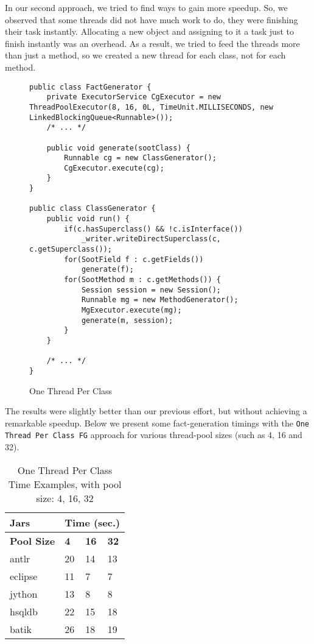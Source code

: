 \documentclass{dithesis}
\begin{document}
        In our second approach, we tried to find ways to gain more speedup. So, we observed that some threads did not have much work to do, they were finishing their task instantly. Allocating a new object and assigning to it a task just to finish instantly was an overhead. As a result, we tried to feed the threads more than just a method, so we created a new thread for each class, not for each method.
        \begin{figure}[H]
\begin{lstlisting}
public class FactGenerator {
    private ExecutorService CgExecutor = new ThreadPoolExecutor(8, 16, 0L, TimeUnit.MILLISECONDS, new LinkedBlockingQueue<Runnable>());
    /* ... */

    public void generate(sootClass) {
        Runnable cg = new ClassGenerator();
        CgExecutor.execute(cg);
    }
}

public class ClassGenerator {
    public void run() {
        if(c.hasSuperclass() && !c.isInterface())
            _writer.writeDirectSuperclass(c, c.getSuperclass());
        for(SootField f : c.getFields())
            generate(f);
        for(SootMethod m : c.getMethods()) {
            Session session = new Session();
            Runnable mg = new MethodGenerator();
            MgExecutor.execute(mg);
            generate(m, session);
        }
    }

    /* ... */
}
\end{lstlisting}
        \caption{One Thread Per Class}
        \end{figure}

        The results were slightly better than our previous effort, but without achieving a remarkable speedup. Below we present some fact-generation timings with the \texttt{One Thread Per Class FG} approach for various thread-pool sizes (such as 4, 16 and 32).
        \begin{table}[H]
			\centering
            \begin{tabular}{@{}l|lll@{}}
            \toprule
            \textbf{Jars}    	& \multicolumn{3}{l}{\textbf{Time (sec.)}}  \\ \midrule
            \textbf{Pool Size} 	& \textbf{4}  & \textbf{16}  & \textbf{32}  \\ \midrule
            antlr            	& 20          & 14           & 13           \\
            eclipse          	& 11          & 7            & 7            \\
            jython           	& 13          & 8            & 8            \\
            hsqldb           	& 22          & 15           & 18           \\
            batik            	& 26          & 18           & 19           \\ \bottomrule
            \end{tabular}
            \newline
			\caption[One Thread Per Class Time Examples]{One Thread Per Class Time Examples, with pool size: 4, 16, 32}
		\end{table}
\end{document}
